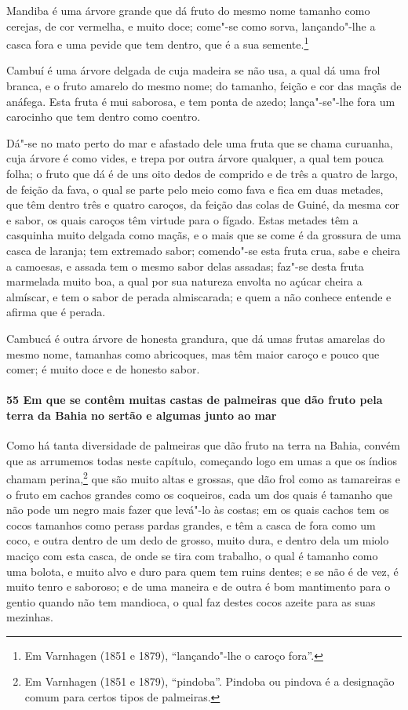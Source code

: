 \begin{linenumbers}
Mandiba é uma árvore grande que dá fruto do mesmo nome tamanho como cerejas, de cor
vermelha, e muito doce; come"-se como sorva, lançando"-lhe a casca fora e uma pevide que tem
dentro, que é a sua semente.\footnote{ Em Varnhagen (1851 e 1879), ``lançando"-lhe o caroço
fora''.}

Cambuí é uma árvore delgada de cuja madeira se não usa, a qual dá uma frol branca, e o
fruto amarelo do mesmo nome; do tamanho, feição e cor das maçãs de anáfega. Esta fruta é
mui saborosa, e tem ponta de azedo; lança"-se"-lhe fora um carocinho que tem dentro como
coentro.

Dá"-se no mato perto do mar e afastado dele uma fruta que se chama curuanha, cuja árvore é
como vides, e trepa por outra árvore qualquer, a qual tem pouca folha; o fruto que dá é de
uns oito dedos de comprido e de três a quatro de largo, de feição da fava, o qual se parte
pelo meio como fava e fica em duas metades, que têm dentro três e quatro caroços, da
feição das colas de Guiné, da mesma cor e sabor, os quais caroços têm virtude para o
fígado. Estas metades têm a casquinha muito delgada como maçãs, e o mais que se come é da
grossura de uma casca de laranja; tem extremado sabor; comendo"-se esta fruta crua, sabe e
cheira a camoesas, e assada tem o mesmo sabor delas assadas; faz"-se desta fruta marmelada
muito boa, a qual por sua natureza envolta no açúcar cheira a almíscar, e tem o sabor de
perada almiscarada; e quem a não conhece entende e afirma que é perada.

Cambucá é outra árvore de honesta grandura, que dá umas frutas amarelas do mesmo nome,
tamanhas como abricoques, mas têm maior caroço e pouco que comer; é muito doce e de
honesto sabor.

\paragraph{55 Em que se contêm muitas castas de palmeiras que dão fruto pela terra da
Bahia no sertão e algumas junto ao mar}\quad
Como há tanta diversidade de palmeiras que dão fruto na terra na Bahia, convém que as
arrumemos todas neste capítulo, começando logo em umas a que os índios chamam
perina,\footnote{ Em Varnhagen (1851 e 1879), ``pindoba''. Pindoba ou pindova é a
designação comum para certos tipos de palmeiras.} que são muito altas e grossas, que dão
frol como as tamareiras e o fruto em cachos grandes como os coqueiros, cada um dos quais é
tamanho que não pode um negro mais fazer que levá"-lo às costas; em os quais cachos tem os
cocos tamanhos como perass pardas grandes, e têm a casca de fora como um coco, e outra
dentro de um dedo de grosso, muito dura, e dentro dela um miolo maciço com esta casca, de
onde se tira com trabalho, o qual é tamanho como uma bolota, e muito alvo e duro para quem
tem ruins dentes; e se não é de vez, é muito tenro e saboroso; e de uma maneira e de outra
é bom mantimento para o gentio quando não tem mandioca, o qual faz destes cocos azeite
para as suas mezinhas.


\end{linenumbers}
